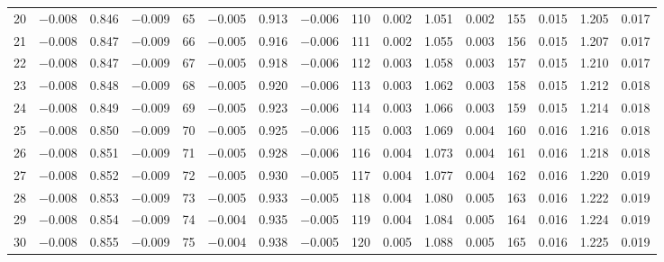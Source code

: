\begin{table}[!h]
{\begin{tabular}{rrrr|rrrr|rrrr|crrr}
 20 & \tiny{ $-$0.008} &   0.846 & \tiny{ $-$0.009} &  65 & \tiny{ $-$0.005} &   0.913 & \tiny{ $-$0.006} & 110 & \tiny{  0.002} &   1.051 & \tiny{  0.002} & 155 & \tiny{  0.015} &   1.205 & \tiny{  0.017}\\
 21 & \tiny{ $-$0.008} &   0.847 & \tiny{ $-$0.009} &  66 & \tiny{ $-$0.005} &   0.916 & \tiny{ $-$0.006} & 111 & \tiny{  0.002} &   1.055 & \tiny{  0.003} & 156 & \tiny{  0.015} &   1.207 & \tiny{  0.017}\\
 22 & \tiny{ $-$0.008} &   0.847 & \tiny{ $-$0.009} &  67 & \tiny{ $-$0.005} &   0.918 & \tiny{ $-$0.006} & 112 & \tiny{  0.003} &   1.058 & \tiny{  0.003} & 157 & \tiny{  0.015} &   1.210 & \tiny{  0.017}\\
 23 & \tiny{ $-$0.008} &   0.848 & \tiny{ $-$0.009} &  68 & \tiny{ $-$0.005} &   0.920 & \tiny{ $-$0.006} & 113 & \tiny{  0.003} &   1.062 & \tiny{  0.003} & 158 & \tiny{  0.015} &   1.212 & \tiny{  0.018}\\
 24 & \tiny{ $-$0.008} &   0.849 & \tiny{ $-$0.009} &  69 & \tiny{ $-$0.005} &   0.923 & \tiny{ $-$0.006} & 114 & \tiny{  0.003} &   1.066 & \tiny{  0.003} & 159 & \tiny{  0.015} &   1.214 & \tiny{  0.018}\\
 25 & \tiny{ $-$0.008} &   0.850 & \tiny{ $-$0.009} &  70 & \tiny{ $-$0.005} &   0.925 & \tiny{ $-$0.006} & 115 & \tiny{  0.003} &   1.069 & \tiny{  0.004} & 160 & \tiny{  0.016} &   1.216 & \tiny{  0.018}\\
 26 & \tiny{ $-$0.008} &   0.851 & \tiny{ $-$0.009} &  71 & \tiny{ $-$0.005} &   0.928 & \tiny{ $-$0.006} & 116 & \tiny{  0.004} &   1.073 & \tiny{  0.004} & 161 & \tiny{  0.016} &   1.218 & \tiny{  0.018}\\
 27 & \tiny{ $-$0.008} &   0.852 & \tiny{ $-$0.009} &  72 & \tiny{ $-$0.005} &   0.930 & \tiny{ $-$0.005} & 117 & \tiny{  0.004} &   1.077 & \tiny{  0.004} & 162 & \tiny{  0.016} &   1.220 & \tiny{  0.019}\\
 28 & \tiny{ $-$0.008} &   0.853 & \tiny{ $-$0.009} &  73 & \tiny{ $-$0.005} &   0.933 & \tiny{ $-$0.005} & 118 & \tiny{  0.004} &   1.080 & \tiny{  0.005} & 163 & \tiny{  0.016} &   1.222 & \tiny{  0.019}\\
 29 & \tiny{ $-$0.008} &   0.854 & \tiny{ $-$0.009} &  74 & \tiny{ $-$0.004} &   0.935 & \tiny{ $-$0.005} & 119 & \tiny{  0.004} &   1.084 & \tiny{  0.005} & 164 & \tiny{  0.016} &   1.224 & \tiny{  0.019}\\
 30 & \tiny{ $-$0.008} &   0.855 & \tiny{ $-$0.009} &  75 & \tiny{ $-$0.004} &   0.938 & \tiny{ $-$0.005} & 120 & \tiny{  0.005} &   1.088 & \tiny{  0.005} & 165 & \tiny{  0.016} &   1.225 & \tiny{  0.019}\\

\end{tabular}}
\end{table}
